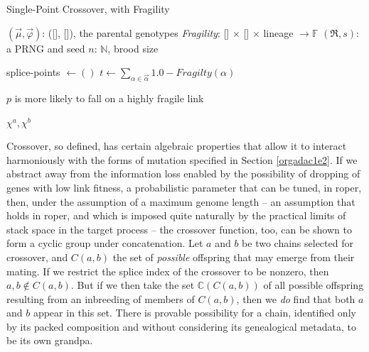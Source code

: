 \documentclass[12pt,glossary]{dalthesis}
\begin{document}
\begin{algorithm}
\caption{Single-Point Crossover, with Fragility} \label{alg:crossover}
\begin{algorithmic}[1]

\REQUIRE $(\vec{\mu}, \vec{\varphi})$: ([\!], [\!]), the parental genotypes 
\REQUIRE \emph{Fragility}: [\!] $\times$ [\!] $\times$ lineage $\to \mathbb{F}$ 
\REQUIRE $(\mathfrak{R}, s)$: a PRNG and seed \REQUIRE $n$: $\mathbb{N}$, brood size


\STATE
{splice-points $\gets ()$}  \FOR {$\vec{\alpha} \in (\vec{\mu }, \vec{\varphi})$} 
\STATE
{$t \gets \sum_{\alpha \in \vec{\alpha}} 1.0 - \textit{Fragilty}(\alpha)$}

 \COMMENT
{$p$ is more likely to fall on a highly fragile link} 

  
 \ENDWHILE 
{} \ENDFOR 
{} 

 \RETURN
{$\chi^a, \chi^b$} 
\end{algorithmic} 
\end{algorithm}

Crossover, so defined, has certain algebraic properties that allow it
to interact harmoniously with the forms of mutation specified in 
Section \ref{orgadac1e2}. If we abstract away from the information loss
enabled by the possibility of dropping of genes with low link fitness, a
probabilistic parameter that can be tuned, in \gls{roper}, then, under the
assumption of a maximum genome length -- an assumption that holds in \gls{roper},
and which is imposed quite naturally by the practical limits of stack space in
the target process -- the crossover function, too, can be shown to form a cyclic group
under concatenation. Let \(a\) and \(b\) be two chains selected for crossover, and 
\(C(a,b)\) the set of \emph{possible} offspring that may emerge from their mating. If
we restrict the splice index of the crossover to be nonzero, then \(a,b \not \in C(a,b)\).
But if we then take the set \(\mathbb{C}(C(a,b))\) of all possible offspring resulting
from an inbreeding of members of \(C(a,b)\), then we \emph{do} find that both \(a\) and \(b\)
appear in this set. There is provable possibility for a chain, identified only by
its packed composition and without considering its genealogical metadata, to be its
own grandpa. 
\end{document}
